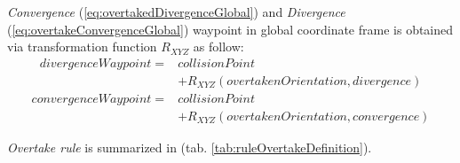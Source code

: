 \emph{Convergence} (\ref{eq:overtakedDivergenceGlobal}) and \emph{Divergence} (\ref{eq:overtakeConvergenceGlobal}) waypoint in global coordinate frame is obtained via transformation function $R_{XYZ}$ as follow:
\begin{equation}\label{eq:overtakedDivergenceGlobal}
    \begin{split}
        divergenceWaypoint = & collisionPoint \\ &+ R_{XYZ}(overtakenOrientation,divergence)    
    \end{split}
\end{equation}
\begin{equation}\label{eq:overtakeConvergenceGlobal}
    \begin{split}
        convergenceWaypoint =  & collisionPoint \\ &+ R_{XYZ}(overtakenOrientation,convergence) 
    \end{split}
\end{equation}

\noindent \emph{Overtake rule} is summarized in (tab. \ref{tab:ruleOvertakeDefinition}).    
        
